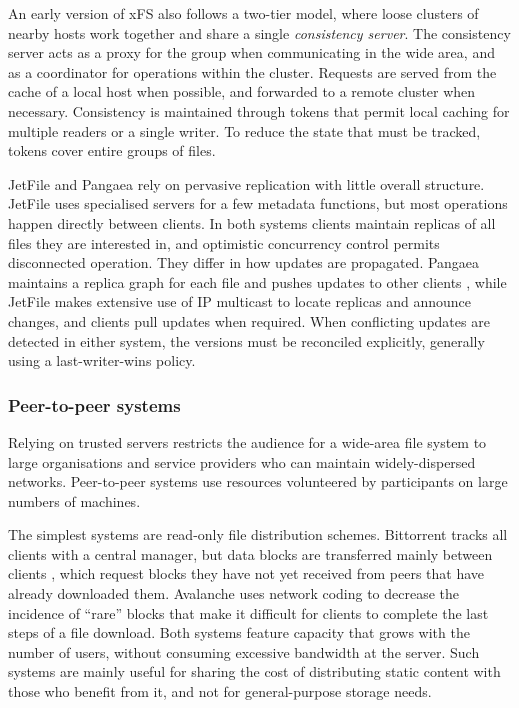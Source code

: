 An early version of xFS \cite{wang93} also follows a two-tier model, where loose clusters of nearby hosts work together and share a single \emph{consistency server}. The consistency server acts as a proxy for the group when communicating in the wide area, and as a coordinator for operations within the cluster. Requests are served from the cache of a local host when possible, and forwarded to a remote cluster when necessary. Consistency is maintained through tokens that permit local caching for multiple readers or a single writer. To reduce the state that must be tracked, tokens cover entire groups of files.

JetFile \cite{gronvall} and Pangaea \cite{saito02a} rely on pervasive replication with little overall structure. JetFile  uses specialised servers for a few metadata functions, but most operations happen directly between clients. In both systems clients maintain replicas of all files they are interested in, and optimistic concurrency control permits disconnected operation. They differ in how updates are propagated. Pangaea maintains a replica graph for each file and pushes updates to other clients \cite{saito02b}, while JetFile makes extensive use of IP multicast to locate replicas and announce changes, and clients pull updates when required. When conflicting updates are detected in either system, the versions must be reconciled explicitly, generally using a last-writer-wins policy.

\subsubsection{Peer-to-peer systems}

Relying on trusted servers restricts the audience for a wide-area file system to large organisations and service providers who can maintain widely-dispersed networks. Peer-to-peer systems use resources volunteered by participants on large numbers of machines.

The simplest systems are read-only file distribution schemes. Bittorrent tracks all clients with a central manager, but data blocks are transferred mainly between clients \cite{cohen,pouwelse}, which request blocks they have not yet received from peers that have already downloaded them. Avalanche \cite{gkantsidis} uses network coding to decrease the incidence of ``rare'' blocks that make it difficult for clients to complete the last steps of a file download. Both systems feature capacity that grows with the number of users, without consuming excessive bandwidth at the server. Such systems are mainly useful for sharing the cost of distributing static content with those who benefit from it, and not for general-purpose storage needs.

